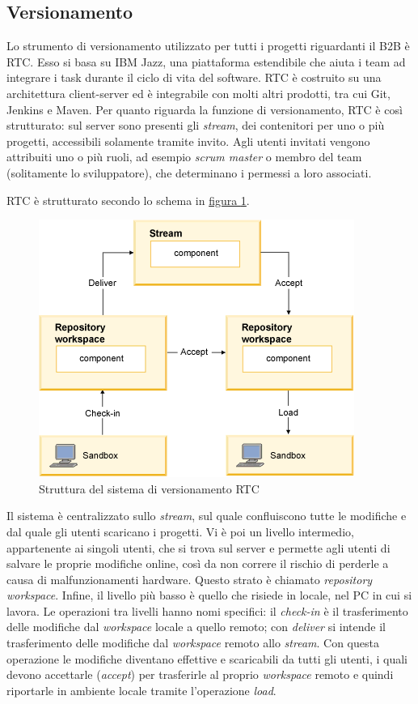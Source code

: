 \subsection{Versionamento}
Lo strumento di versionamento utilizzato per tutti i progetti riguardanti il B2B è \Gls{RTC}. Esso si basa su IBM Jazz, una piattaforma estendibile che aiuta i team ad integrare i task durante il ciclo di vita del software. RTC è costruito su una architettura client-server ed è integrabile con molti altri prodotti, tra cui \gls{Git}, \Gls{Jenkins} e \Gls{Maven}. Per quanto riguarda la funzione di versionamento, RTC è così strutturato: sul server sono presenti gli \textit{stream}, dei contenitori per uno o più progetti, accessibili solamente tramite invito. Agli utenti invitati vengono attribuiti uno o più ruoli, ad esempio \textit{scrum master} o membro del team (solitamente lo sviluppatore), che determinano i permessi a loro associati. 

RTC è strutturato secondo lo schema in \hyperref[fig:rtc-struttura]{figura \ref{fig:rtc-struttura}}\autocite{bib:rtcDoc}.
\begin{figure}
	\centering
	\includegraphics{Immagini/rtc-struttura.png}
	\caption{Struttura del sistema di versionamento RTC}
	\label{fig:rtc-struttura}
\end{figure}
Il sistema è centralizzato sullo \textit{stream}, sul quale confluiscono tutte le modifiche e dal quale gli utenti scaricano i progetti. Vi è poi un livello intermedio, appartenente ai singoli utenti, che si trova sul server e permette agli utenti di salvare le proprie modifiche online, così da non correre il rischio di perderle a causa di malfunzionamenti hardware. Questo strato è chiamato \textit{repository workspace}. Infine, il livello più basso è quello che risiede in locale, nel PC in cui si lavora. Le operazioni tra livelli hanno nomi specifici: il \textit{check-in} è il trasferimento delle modifiche dal \textit{workspace} locale a quello remoto; con \textit{deliver} si intende il trasferimento delle modifiche dal \textit{workspace} remoto allo \textit{stream}. Con questa operazione le modifiche diventano effettive e scaricabili da tutti gli utenti, i quali devono accettarle (\textit{accept}) per trasferirle al proprio \textit{workspace} remoto e quindi riportarle in ambiente locale tramite l'operazione \textit{load}.

